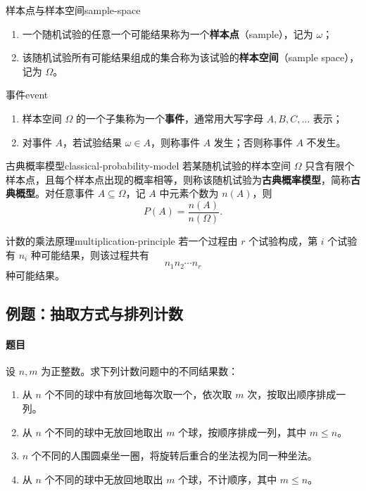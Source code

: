 \begin{mydefinition}{样本点与样本空间}{sample-space}
\begin{enumerate}
\item 一个随机试验的任意一个可能结果称为一个\textbf{样本点}（sample），记为 $\omega$；
\item 该随机试验所有可能结果组成的集合称为该试验的\textbf{样本空间}（sample space），记为 $\Omega$。
\end{enumerate}
\end{mydefinition}

\begin{mydefinition}{事件}{event}
\begin{enumerate}
\item 样本空间 $\Omega$ 的一个子集称为一个\textbf{事件}，通常用大写字母 $A,B,C,\ldots$ 表示；
\item 对事件 $A$，若试验结果 $\omega\in A$，则称事件 $A$ 发生；否则称事件 $A$ 不发生。
\end{enumerate}
\end{mydefinition}

\begin{mydefinition}{古典概率模型}{classical-probability-model}
若某随机试验的样本空间 $\Omega$ 只含有限个样本点，且每个样本点出现的概率相等，则称该随机试验为\textbf{古典概率模型}，简称\textbf{古典概型}。对任意事件 $A\subseteq\Omega$，记 $A$ 中元素个数为 $n(A)$，则
\[
P(A)=\dfrac{n(A)}{n(\Omega)}.
\]
\end{mydefinition}

\begin{proposition}{计数的乘法原理}{multiplication-principle}
若一个过程由 $r$ 个试验构成，第 $i$ 个试验有 $n_i$ 种可能结果，则该过程共有
\[
n_1n_2\cdots n_r
\]
种可能结果。
\end{proposition}

\subsection{例题：抽取方式与排列计数}\label{note:c1:e1}
\paragraph{题目}
设 $n,m$ 为正整数。求下列计数问题中的不同结果数：
\begin{enumerate}
\item 从 $n$ 个不同的球中有放回地每次取一个，依次取 $m$ 次，按取出顺序排成一列。
\item 从 $n$ 个不同的球中无放回地取出 $m$ 个球，按顺序排成一列，其中 $m\leq n$。
\item $n$ 个不同的人围圆桌坐一圈，将旋转后重合的坐法视为同一种坐法。
\item 从 $n$ 个不同的球中无放回地取出 $m$ 个球，不计顺序，其中 $m\leq n$。
\end{enumerate}

